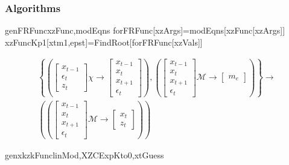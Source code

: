 \documentclass{beamer}
\begin{document}
\begin{frame}
  \frametitle{Algorithms}
  


\begin{pseudocode}{genFRFunc}{xzFunc,modEqns}
forFRFunc[xzArgs]=modEqns[xzFunc[xzArgs]]\\
xzFuncKp1[xtm1,epst]=FindRoot[forFRFunc[xzVals]]\\
\end{pseudocode}
\begin{gather}
\left \{
\left (
\begin{bmatrix}
x_{t-1}\\ \epsilon_t\\z_t
\end{bmatrix}
\chi \rightarrow
\begin{bmatrix}
x_{t-1}\\  x_t\\x_{t+1}\\ \epsilon_t
\end{bmatrix} \right )
,
  \left (
\begin{bmatrix}
x_{t-1}\\x_{t}\\x_{t+1}\\ \epsilon_t
\end{bmatrix}
\mathcal{M} \rightarrow
\begin{bmatrix}
m_e
\end{bmatrix} \right ) \right \}
\rightarrow\\
\left (
  \left (
\begin{bmatrix}
x_{t-1}\\x_{t}\\x_{t+1}\\ \epsilon_t
\end{bmatrix}
\mathcal{M} \rightarrow
\begin{bmatrix}
x_t\\z_t
\end{bmatrix} \right ) 
\right )
\end{gather}


\begin{pseudocode}{genxkzkFunc}{linMod,XZCExpKto0,xtGuess}
\end{pseudocode}


\end{frame}
\end{document}
